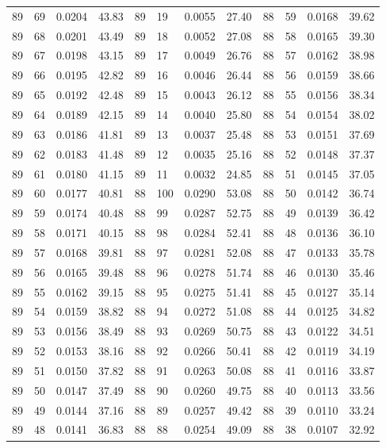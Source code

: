 \begin{tabular}{llll|llll|llll}
89 & 69 & 0.0204 & 43.83 & 89 & 19 & 0.0055 & 27.40 & 88 & 59 & 0.0168 & 39.62\\
89 & 68 & 0.0201 & 43.49 & 89 & 18 & 0.0052 & 27.08 & 88 & 58 & 0.0165 & 39.30\\
89 & 67 & 0.0198 & 43.15 & 89 & 17 & 0.0049 & 26.76 & 88 & 57 & 0.0162 & 38.98\\
89 & 66 & 0.0195 & 42.82 & 89 & 16 & 0.0046 & 26.44 & 88 & 56 & 0.0159 & 38.66\\
89 & 65 & 0.0192 & 42.48 & 89 & 15 & 0.0043 & 26.12 & 88 & 55 & 0.0156 & 38.34\\
89 & 64 & 0.0189 & 42.15 & 89 & 14 & 0.0040 & 25.80 & 88 & 54 & 0.0154 & 38.02\\
89 & 63 & 0.0186 & 41.81 & 89 & 13 & 0.0037 & 25.48 & 88 & 53 & 0.0151 & 37.69\\
89 & 62 & 0.0183 & 41.48 & 89 & 12 & 0.0035 & 25.16 & 88 & 52 & 0.0148 & 37.37\\
89 & 61 & 0.0180 & 41.15 & 89 & 11 & 0.0032 & 24.85 & 88 & 51 & 0.0145 & 37.05\\
89 & 60 & 0.0177 & 40.81 & 88 & 100 & 0.0290 & 53.08 & 88 & 50 & 0.0142 & 36.74\\
89 & 59 & 0.0174 & 40.48 & 88 & 99 & 0.0287 & 52.75 & 88 & 49 & 0.0139 & 36.42\\
89 & 58 & 0.0171 & 40.15 & 88 & 98 & 0.0284 & 52.41 & 88 & 48 & 0.0136 & 36.10\\
89 & 57 & 0.0168 & 39.81 & 88 & 97 & 0.0281 & 52.08 & 88 & 47 & 0.0133 & 35.78\\
89 & 56 & 0.0165 & 39.48 & 88 & 96 & 0.0278 & 51.74 & 88 & 46 & 0.0130 & 35.46\\
89 & 55 & 0.0162 & 39.15 & 88 & 95 & 0.0275 & 51.41 & 88 & 45 & 0.0127 & 35.14\\
89 & 54 & 0.0159 & 38.82 & 88 & 94 & 0.0272 & 51.08 & 88 & 44 & 0.0125 & 34.82\\
89 & 53 & 0.0156 & 38.49 & 88 & 93 & 0.0269 & 50.75 & 88 & 43 & 0.0122 & 34.51\\
89 & 52 & 0.0153 & 38.16 & 88 & 92 & 0.0266 & 50.41 & 88 & 42 & 0.0119 & 34.19\\
89 & 51 & 0.0150 & 37.82 & 88 & 91 & 0.0263 & 50.08 & 88 & 41 & 0.0116 & 33.87\\
89 & 50 & 0.0147 & 37.49 & 88 & 90 & 0.0260 & 49.75 & 88 & 40 & 0.0113 & 33.56\\
89 & 49 & 0.0144 & 37.16 & 88 & 89 & 0.0257 & 49.42 & 88 & 39 & 0.0110 & 33.24\\
89 & 48 & 0.0141 & 36.83 & 88 & 88 & 0.0254 & 49.09 & 88 & 38 & 0.0107 & 32.92\\

\end{tabular}
